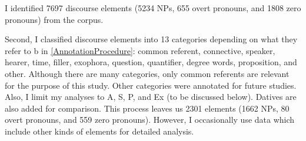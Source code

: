 I identified 7697 discourse elements (5234 NPs, 655 overt pronouns, and 1808 zero pronouns) from the corpus.

Second, I classified discourse elements into 13 categories depending on what they refer to b in \ref{AnnotationProcedure}:
common referent, connective, speaker, hearer, time, filler, exophora, question, quantifier, degree words, proposition, and other.
Although there are many categories,
only common referents are relevant for the purpose of this study.
Other categories were annotated for future studies.
Also, I limit my analyses to A, S, P, and Ex (to be discussed below).
Datives are also added for comparison.
This process leaves us
2301 elements (1662 NPs, 80 overt pronouns, and 559 zero pronouns).
However, I occasionally use data which include other kinds of elements
for detailed analysis.

